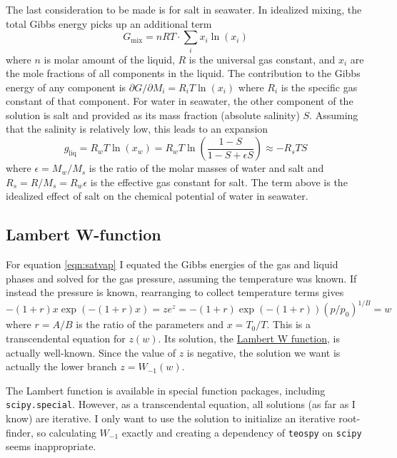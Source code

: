\documentclass{article}
\newcommand{\liq}{\text{liq}}
\begin{document}
The last consideration to be made is for salt in seawater. In idealized mixing, the total Gibbs energy picks up an additional term
\begin{equation*}
    G_{\text{mix}} = n R T \cdot \sum_i x_i \ln(x_i)
\end{equation*}
where $n$ is molar amount of the liquid, $R$ is the universal gas constant, and $x_i$ are the mole fractions of all components in the liquid. The contribution to the Gibbs energy of any component is $\partial G/\partial M_i = R_i T \ln(x_i)$ where $R_i$ is the specific gas constant of that component. For water in seawater, the other component of the solution is salt and provided as its mass fraction (absolute salinity) $S$. Assuming that the salinity is relatively low, this leads to an expansion
\begin{equation*}
    g_{\liq} = R_w T \ln(x_w) = R_w T \ln\left( \frac{1-S}{1-S + \epsilon S} \right) \approx -R_s T S
\end{equation*}
where $\epsilon = M_w/M_s$ is the ratio of the molar masses of water and salt and $R_s = R/M_s = R_w \epsilon$ is the effective gas constant for salt. The term above is the idealized effect of salt on the chemical potential of water in seawater.


\subsection{Lambert W-function}

For equation \ref{eqn:satvap} I equated the Gibbs energies of the gas and liquid phases and solved for the gas pressure, assuming the temperature was known. If instead the pressure is known, rearranging to collect temperature terms gives
\begin{equation*}
    -(1+r) x \exp(-(1+r) x) = z e^z = -(1+r) \exp(-(1+r)) (p/p_0)^{1/B} = w
\end{equation*}
where $r = A/B$ is the ratio of the parameters and $x=T_0/T$. This is a transcendental equation for $z(w)$. Its solution, the \href{https://en.wikipedia.org/wiki/Lambert_W_function}{Lambert W function}, is actually well-known. Since the value of $z$ is negative, the solution we want is actually the lower branch $z = W_{-1}(w)$.

The Lambert function is available in special function packages, including \texttt{scipy.special}. However, as a transcendental equation, all solutions (as far as I know) are iterative. I only want to use the solution to initialize an iterative root-finder, so calculating $W_{-1}$ exactly and creating a dependency of \texttt{teospy} on \texttt{scipy} seems inappropriate.
\end{document}
